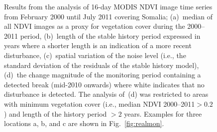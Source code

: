 \documentclass[authoryear,preprint,review,10pt]{elsarticle}
\begin{document}
\begin{figure}[htp]
 \caption{Results from the analysis of 16-day MODIS NDVI image time series from February 2000 until July 2011 covering Somalia; (a)~median of all NDVI
 images as a proxy for vegetation cover during the 2000--2011 period, (b)~length of the stable history period expressed in years where a shorter length is an indication of a more recent disturbance, (c)~spatial variation of the noise level (i.e., the standard deviation of the residuals of the stable history model), (d)~the change magnitude of the monitoring period containing a detected break (mid-2010 onwards) where white indicates that no disturbance is detected. The analysis of~(d) was restricted to areas with minimum vegetation cover (i.e., median NDVI  2000--2011$> 0.2$) and length of the history period $> 2$ years. Examples for three locations a, b, and c  are shown in Fig.~\ref{fig:realmon}.}
 \label{fig:spatial}
\end{figure}
\end{document}
